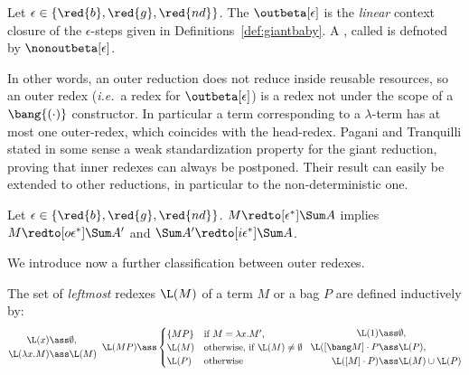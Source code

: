 \begin{definition}\label{def:outerreduction}
Let $\epsilon\in\{\red{b}, \red{g}, \red{nd}\}$. The  $\outbeta[\epsilon]$ is the 
 \emph{linear} context closure of the $\epsilon$-steps given in
Definitions~\ref{def:giantbaby}. 
A , called  is
defnoted by $\nonoutbeta[\epsilon]$.
\end{definition}
In other words, an outer reduction does not reduce inside reusable resources, so
an outer redex (\emph{i.e.}\ a redex for $\outbeta[\epsilon]$) is a redex not under the scope of a 
$\bang{(\cdot)}$ constructor. In particular a term corresponding to a 
$\lambda$-term has at most one outer-redex, which coincides with the head-redex.
Pagani and Tranquilli stated in some sense a weak standardization property for the giant reduction,
proving that inner redexes can always be postponed. Their result
can easily be extended to other reductions, in particular to the non-deterministic one.

\begin{theorem}\label{the:patra}
Let $\epsilon\in\{\red{b}, \red{g}, \red{nd}\}$. $M \redto[\epsilon^*]\Sum A $ implies $M \redto[o\epsilon^{*}]\Sum A' $ and $\Sum A' \redto[i\epsilon^{*}]\Sum A$.
\end{theorem}

We introduce now a further classification between outer redexes.
\begin{definition}
The set of \emph{leftmost} redexes $\L(M)$ of a term $M$ or a bag $P$ are defined
  inductively by:
  $$\begin{aligned}
    \L(x) &\ass  \emptyset,\\ \L(\lambda x.M) &\ass\L(M)
  \end{aligned}
  \;\;
    \L(MP) \ass
    \begin{cases}
      \{MP\} & \text{if $M=\lambda x.M'$,}\\
      \L(M) & \text{otherwise, if $\L(M)\neq \emptyset$}\\
      \L(P) & \text{otherwise}
    \end{cases}
    \;\;
    \begin{aligned}
      \L(1) &\ass \emptyset,\\
      \L([\bang M]\cdot P &\ass \L(P),\\
      \L([M]\cdot P) &\ass \L(M) \cup \L(P)
    \end{aligned}
  $$
\end{definition}


